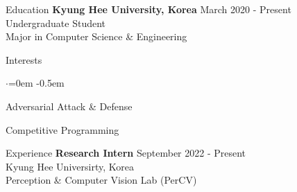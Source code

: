\documentclass{resume}
\begin{document}
  \begin{rSection}{Education}
    {\bf Kyung Hee University, Korea } \hfill {March 2020 - Present} \\ 
    { Undergraduate Student } \\
    { Major in Computer Science \& Engineering }
  \end{rSection}
  
  \begin{rSection}{Interests}
    \begin{list}{$\cdot$}{\leftmargin=0em}
      \itemsep -0.5em
        \item Adversarial Attack \& Defense
        \item Competitive Programming
    \end{list}
  \end{rSection}

  \begin{rSection}{Experience}
    {\bf Research Intern } \hfill {September 2022 - Present} \\ 
    { Kyung Hee Universirty, Korea } \\
    { Perception \& Computer Vision Lab (PerCV) }
  \end{rSection}
\end{document}
